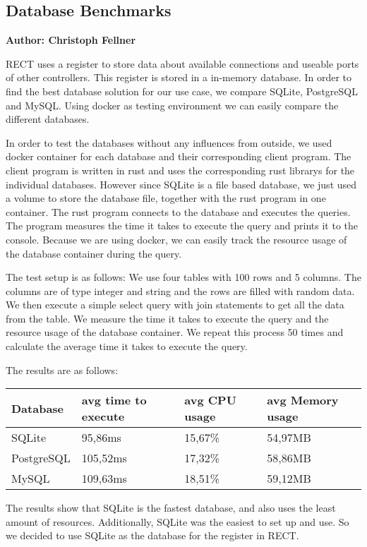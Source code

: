 \subsection{Database Benchmarks}
\textbf{Author: Christoph Fellner}

RECT uses a register to store data about available connections and useable ports of other controllers. This register is stored in a in-memory database. In order to find the 
best database solution for our use case, we compare SQLite, PostgreSQL and MySQL. Using docker as testing environment we can easily compare the different databases.\newline

In order to test the databases without any influences from outside, we used docker container for each database and their corresponding client program. The client program
is written in rust and uses the corresponding rust librarys for the individual databases. However since SQLite is a file based database, we just used a volume to store the
database file, together with the rust program in one container. The rust program connects to the database and executes the queries. The program measures the time it 
takes to execute the query and prints it to the console. Because we are using docker, we can easily track the resource usage of the database container during the query.\newline

The test setup is as follows: We use four tables with 100 rows and 5 columns. The columns are of type integer and string and the rows are filled with random data. We then 
execute a simple select query with join statements to get all the data from the table. We measure the time it takes to execute the query and the resource usage of the database 
container. We repeat this process 50 times and calculate the average time it takes to execute the query.\newline

The results are as follows:
\begin{center}
    \begin{tabular}{ | m{3cm} | m{4cm}| m{4cm} | m{4cm} | } 
      \hline
      Database & avg time to execute & avg CPU usage & avg Memory usage \\ 
      \hline
      SQLite & 95,86ms & 15,67\% & 54,97MB \\ 
      \hline
      PostgreSQL & 105,52ms & 17,32\% & 58,86MB \\ 
      \hline
      MySQL & 109,63ms & 18,51\% & 59,12MB \\
      \hline
    \end{tabular}
\end{center}

The results show that SQLite is the fastest database, and also uses the least amount of resources. Additionally, SQLite was the easiest to set up and use. So we decided to use
SQLite as the database for the register in RECT.

\filbreak